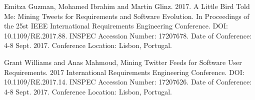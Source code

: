 \documentclass[a4paper,10pt, bibliography=totocnumbered]{scrreprt}
\begin{document}


\begin{thebibliography}{9}

 Emitza Guzman, Mohamed Ibrahim and Martin Glinz. 2017. A Little Bird Told Me: Mining Tweets for Requirements and Software Evolution. In Proceedings of the 25st IEEE International Requirements Engineering Conference.
DOI: 10.1109/RE.2017.88. INSPEC Accession Number: 17207678. Date of Conference: 4-8 Sept. 2017. Conference Location: Lisbon, Portugal.


 Grant Williams and Anas Mahmoud, Mining Twitter Feeds for Software User Requirements. 2017 International Requirements Engineering Conference.
DOI: 10.1109/RE.2017.14. INSPEC Accession Number: 17207626. Date of Conference: 4-8 Sept. 2017. Conference Location: Lisbon, Portugal.
\end{thebibliography}

\listoffigures

\end{document}
